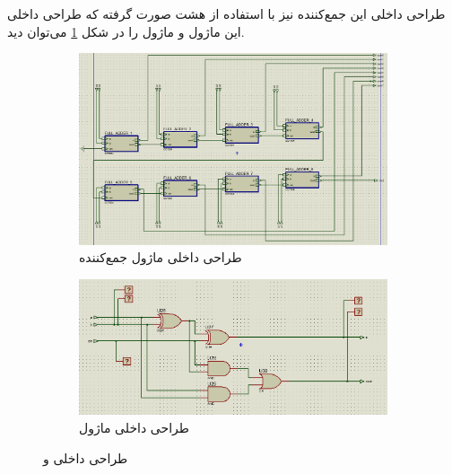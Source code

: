 \documentclass[12pt,onecolumn,a4paper,fleqn]{article}
\begin{document}
	طراحی داخلی این جمع‌کننده نیز با استفاده از هشت  صورت گرفته که طراحی داخلی این ماژول و ماژول  را در شکل \ref{fig:adder_inner} می‌توان دید.
	\begin{figure}[H]
		\begin{subfigure}{0.5\textwidth}
			\centering
			\includegraphics[width=\textwidth]{source/adder_inner.png}
			\caption{طراحی داخلی ماژول جمع‌کننده}
		\end{subfigure}
		\hfill
		\begin{subfigure}{0.4\textwidth}
			\centering
			\includegraphics[width=\textwidth]{source/fulladder_inner.png}
			\caption{طراحی داخلی ماژول }
		\end{subfigure}
		\caption{طراحی داخلی  و }
		\label{fig:adder_inner}
	\end{figure}
\end{document}
